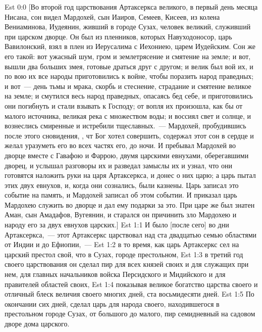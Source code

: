 \vs Est 0:0 [Во второй год царствования Артаксеркса великого, в первый день месяца Нисана, сон видел Мардохей, сын Иаиров, Семеев, Кисеев, из колена Вениаминова, Иудеянин, живший в городе Сузах, человек великий, служивший при царском дворце. Он был из пленников, которых Навуходоносор, царь Вавилонский, взял в плен из Иерусалима с Иехониею, царем Иудейским. Сон же его такой: вот ужасный шум, гром и землетрясение и смятение на земле; и вот, вышли два больших змея, готовые драться друг с другом; и велик был вой их, и по вою их все народы приготовились к войне, чтобы поразить народ праведных; и вот~--- день тьмы и мрака, скорбь и стеснение, страдание и смятение великое на земле; и смутился весь народ праведных, опасаясь бед себе, и приготовились они погибнуть и стали взывать к Господу; от вопля их произошла, как бы от малого источника, великая река с множеством воды; и воссиял свет и солнце, и вознеслись смиренные и истребили тщеславных.~--- Мардохей, пробудившись после этого сновидения, , чт Бог хотел совершить, содержал этот сон в сердце и желал уразуметь его во всех частях его, до ночи. И пребывал Мардохей во дворце вместе с Гавафою и Фаррою, двумя царскими евнухами, оберегавшими дворец, и услышал разговоры их и разведал замыслы их и узнал, что они готовятся наложить руки на царя Артаксеркса, и донес о них царю; а царь пытал этих двух евнухов, и, когда они сознались, были казнены. Царь записал это событие на память, и Мардохей записал об этом событии. И приказал царь Мардохею служить во дворце и дал ему подарки за это. При царе же был  знатен Аман, сын Амадафов, Вугеянин, и старался он причинить зло Мардохею и народу его за двух евнухов царских.]
\rsbpar\vs Est 1:1 И было [после сего] во дни Артаксеркса,~--- этот Артаксеркс царствовал над ста двадцатью семью областями от Индии и до Ефиопии,~---
\vs Est 1:2 в то время, как царь Артаксеркс сел на царский престол свой, что в Сузах, городе престольном,
\vs Est 1:3 в третий год своего царствования он сделал пир для всех князей своих и для служащих при нем, для главных начальников войска Персидского и Мидийского и для правителей областей своих,
\vs Est 1:4 показывая великое богатство царства своего и отличный блеск величия своего  многих дней, ста восьмидесяти дней.
\vs Est 1:5 По окончании сих дней, сделал царь для народа своего, находившегося в престольном городе Сузах, от большого до малого, пир семидневный на садовом дворе дома царского.

